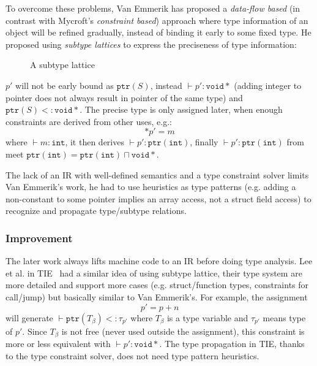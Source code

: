 \documentclass[compsoc,conference,a4paper,10pt,times]{IEEEtran}
\begin{document}
To overcome these problems, Van Emmerik has proposed a \emph{data-flow based}
(in contrast with Mycroft's \emph{constraint based}) approach where type information of an object will be refined gradually,
instead of binding it early to some fixed type. He proposed using \emph{subtype lattices} to express the
preciseness of type information:
\begin{figure}[h]
  \centering
  \caption{A subtype lattice}
\end{figure}
$p'$ will not be early bound as $\mathtt{ptr}(S)$, instead $\vdash p' \colon \mathtt{void*}$
(adding integer to pointer does not always result in pointer of the same type) and
$\mathtt{ptr}(S) <\colon \mathtt{void*}$. The precise type
is only assigned later, when enough constraints are derived from other uses, e.g.:
\begin{equation*}
  *{p'} = m
\end{equation*}
where $\vdash m \colon \mathtt{int}$, it then derives $\vdash p' \colon \mathtt{ptr}(\mathtt{int})$,
finally $\vdash p' \colon \mathtt{ptr}(\mathtt{int})$ from meet
$\mathtt{ptr}(\mathtt{int}) = \mathtt{ptr}(\mathtt{int}) \sqcap \mathtt{void*}$.

The lack of an IR with well-defined semantics and a type constraint solver limits Van Emmerik's work, he had to use heuristics as
type patterns (e.g. adding a non-constant to some pointer implies an array access, not a struct field
access) to recognize and propagate type/subtype relations.

\subsubsection*{Improvement}
\noindent
The later work always lifts machine code to an IR before doing type analysis. Lee et al. in
TIE~\cite{lee_tie_2011} had a similar idea of using subtype lattice, their type system are more
detailed and support more cases (e.g. struct/function types, constraints for call/jump) but basically
similar to Van Emmerik's. For example, the assignment
\begin{equation*}
  p' = p + n
\end{equation*}
will generate $\vdash \mathtt{ptr}(T_{\beta}) <\colon \tau_{p'}$ where $T_{\beta}$ is
a type variable and $\tau_{p'}$ means type of $p'$. Since $T_{\beta}$ is not free (never used outside
the assignment), this constraint is more or less equivalent with $\vdash p' \colon \mathtt{void*}$. The type
propagation in TIE, thanks to the type constraint solver, does not need type pattern heuristics.
\end{document}
